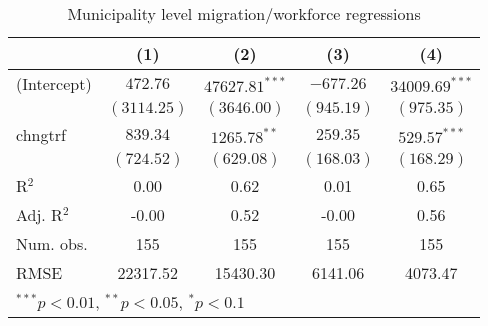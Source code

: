 
\begin{table}
\caption{Municipality level migration/workforce regressions}
\begin{center}
\begin{tabular}{l c c c c }
\hline
 & (1) & (2) & (3) & (4) \\
\hline
(Intercept) & $472.76$    & $47627.81^{***}$ & $-677.26$  & $34009.69^{***}$ \\
            & $(3114.25)$ & $(3646.00)$      & $(945.19)$ & $(975.35)$       \\
chngtrf     & $839.34$    & $1265.78^{**}$   & $259.35$   & $529.57^{***}$   \\
            & $(724.52)$  & $(629.08)$       & $(168.03)$ & $(168.29)$       \\
\hline
R$^2$       & 0.00        & 0.62             & 0.01       & 0.65             \\
Adj. R$^2$  & -0.00       & 0.52             & -0.00      & 0.56             \\
Num. obs.   & 155         & 155              & 155        & 155              \\
RMSE        & 22317.52    & 15430.30         & 6141.06    & 4073.47          \\
\hline
\multicolumn{5}{l}{\scriptsize{$^{***}p<0.01$, $^{**}p<0.05$, $^*p<0.1$}}
\end{tabular}
\label{table:coefficients}
\end{center}
\end{table}
